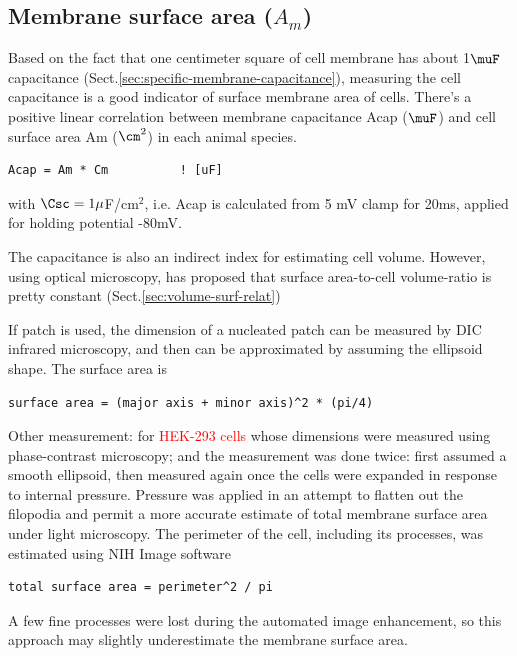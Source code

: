 \subsection{Membrane surface area ($A_m$)}
\label{sec:surface_area_membrane}

Based on the fact that one centimeter square of cell membrane has about 1$\muF$
capacitance (Sect.\ref{sec:specific-membrane-capacitance}), measuring the cell
capacitance is a good indicator of surface membrane area of cells. There's a
positive linear correlation between membrane capacitance Acap ($\muF$) and cell
surface area Am ($\cm^2$) in each animal species.
\begin{verbatim}
Acap = Am * Cm          ! [uF]
\end{verbatim}
with $\Csc=1\mu$F/cm$^2$, i.e. Acap is calculated from 5 mV clamp for 20ms,
applied for holding potential -80mV.

The capacitance is also an indirect index for estimating cell volume. However,
using optical microscopy, \citep{satoh1996svr, delbridge1997} has proposed that
surface area-to-cell volume-ratio is pretty constant
(Sect.\ref{sec:volume-surf-relat})

\begin{mdframed}
If patch is used, the dimension of a nucleated patch can be measured by DIC
infrared microscopy, and then can be approximated by assuming the ellipsoid
shape. The surface area is \citep{gentet2008}
\begin{verbatim}
surface area = (major axis + minor axis)^2 * (pi/4)
\end{verbatim}

\end{mdframed}

Other measurement: \citep{gentet2008} for \textcolor{red}{HEK-293 cells} whose
dimensions were measured using phase-contrast microscopy; and the measurement
was done twice: first assumed a smooth ellipsoid, then measured again once the
cells were expanded in response to internal pressure. Pressure was applied in an
attempt to flatten out the filopodia and permit a more accurate estimate of
total membrane surface area under light microscopy.
The perimeter of the cell, including its processes, was estimated using NIH
Image software
\begin{verbatim}
total surface area = perimeter^2 / pi
\end{verbatim}
A few fine processes were lost during the automated image enhancement,
so this approach may slightly underestimate the membrane surface area.



